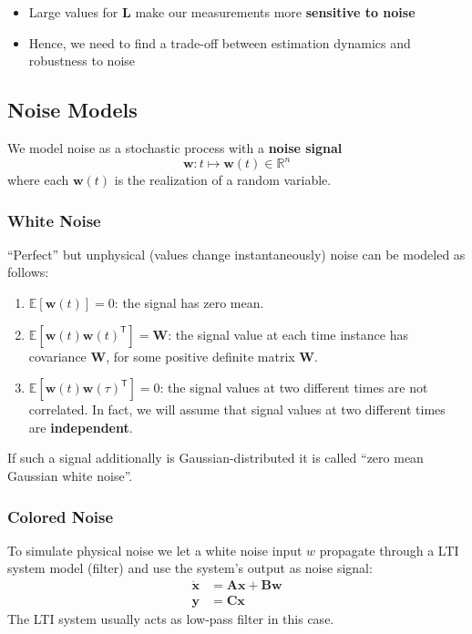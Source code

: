 \begin{itemize}
    \item Large values for $\mathbf{L}$ make our measurements more \textbf{sensitive to noise}
    \item Hence, we need to find a trade-off between estimation dynamics and robustness to noise
\end{itemize}

\subsection{Noise Models}
We model noise as a stochastic process with a \textbf{noise signal}
\begin{equation*}
    \mathbf{w}:t\mapsto \mathbf{w}(t)\in\mathbb{R}^n
\end{equation*}
where each $\mathbf{w}(t)$ is the realization of a random variable.

\subsubsection{White Noise}
``Perfect'' but unphysical (values change instantaneously) noise can be modeled as follows:
\begin{enumerate}
    \item $\mathbb{E}[\mathbf{w}(t)]=0$:\newline
          the signal has zero mean.
    \item $\mathbb{E}[\mathbf{w}(t){\mathbf{w}(t)}^{\mathsf{T}}]=\mathbf{W}$:\newline
          the signal value at each time instance has covariance $\mathbf{W}$, for some positive definite matrix $\mathbf{W}$.
    \item $\mathbb{E}[\mathbf{w}(t){\mathbf{w}(\tau)}^{\mathsf{T}}]=0$:\newline
          the signal values at two different times are not correlated. In fact, we will assume that signal values at two different times are \textbf{independent}.
\end{enumerate}
If such a signal additionally is Gaussian-distributed it is called ``zero mean Gaussian white noise''.

\subsubsection{Colored Noise}
To simulate physical noise we let a white noise input $w$ propagate through a LTI system model (filter) and use the system's output as noise signal:
\begin{align*}
    \dot{\mathbf{x}} & =\mathbf{Ax}+\mathbf{Bw} \\
    \mathbf{ y}      & = \mathbf{Cx}
\end{align*}
The LTI system usually acts as low-pass filter in this case.


